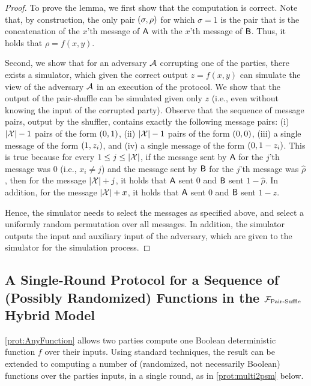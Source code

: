 \begin{proof}
To prove the lemma, we first show that the computation is correct. Note that, by construction,  the only pair $\left(\sigma,\rho\right)$ for which $\sigma = 1$ is the pair that is the concatenation of the $x$'th message of $\mathsf{A}$ with the $x$'th message
of $\mathsf{B}$. Thus, it holds that $\rho = f(x,y)$.

Second, we show that for an adversary $\mathcal{A}$ corrupting one of the parties, there exists a simulator, which given the correct output 
$z = f(x,y)$ can simulate the view of the adversary $\mathcal{A}$ in an execution of the protocol. 
We show that the output of the pair-shuffle can be simulated given only $z$ (i.e., even without knowing the input of the corrupted party). Observe that the sequence of message pairs, output by the shuffler, contains exactly the following message pairs: (i)  $\left|\mathcal{X}\right|-1$ pairs of the form $\left(0,1\right)$, (ii)  $\left|\mathcal{X}\right|-1$ pairs of the form $\left( 0,0\right)$, (iii)  a single message of the form $\left( 1,z_i\right)$, and (iv)  a single message of the form $\left( 0,1-z_i\right)$. This is true because for every $1\le j \le\left|\mathcal{X}\right|$, if the message sent by $\mathsf{A}$ for the $j$'th message was $0$ (i.e., $x_i\neq j$) and the message sent by $\mathsf{B}$ for the $j$'th message was $\hat{\rho}$, then for the message $\left|\mathcal{X}\right|+j$, it holds that $\mathsf{A}$ sent $0$ and $\mathsf{B}$ sent $1-\hat{\rho}$. In addition, for the message $\left|\mathcal{X}\right|+x$, it holds that $\mathsf{A}$ sent $0$ and $\mathsf{B}$ sent $1-z$. 

Hence, the simulator needs to select the messages as specified above, and select a uniformly random permutation over all messages. In addition, the simulator outputs the input and auxiliary input of the adversary, which are given to the simulator for the simulation process.
\end{proof}



\subsection{A Single-Round Protocol for a Sequence of (Possibly Randomized) Functions in the ${\cal F}_{\operatorname{Pair-Suffle}}$ Hybrid Model}\label{sec:multi-genMPC}
\cref{prot:AnyFunction} allows two parties compute one Boolean deterministic function $f$ over their inputs. Using standard techniques, the result can be extended to computing a number of (randomized, not necessarily Boolean) functions  over the parties inputs, in a single round, as in \cref{prot:multi2psm} below. 

